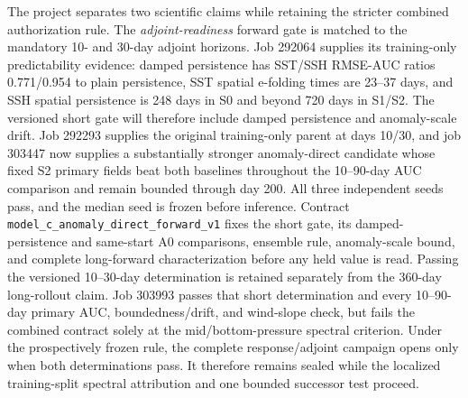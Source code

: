 \documentclass[11pt]{article}
\begin{document}
The project separates two scientific claims while retaining the stricter combined
authorization rule.  The \emph{adjoint-readiness} forward gate is
matched to the mandatory 10- and 30-day adjoint horizons.  Job 292064 supplies its
training-only predictability evidence: damped persistence has SST/SSH RMSE-AUC
ratios 0.771/0.954 to plain persistence, SST spatial e-folding times are
23--37 days, and SSH spatial persistence is 248 days in S0 and beyond 720 days in
S1/S2.  The versioned short gate will therefore include damped persistence and
anomaly-scale drift.  Job 292293 supplies the original training-only parent at days
10/30, and job 303447 now supplies a substantially stronger anomaly-direct candidate
whose fixed S2 primary fields beat both baselines throughout the 10--90-day AUC
comparison and remain bounded through day 200.  All three independent seeds pass,
and the median seed is frozen before inference.  Contract
\texttt{model\_c\_anomaly\_direct\_forward\_v1} fixes the short gate, its
damped-persistence and same-start A0 comparisons, ensemble rule, anomaly-scale bound,
and complete long-forward characterization before any held value is read.  Passing the
versioned 10--30-day determination is retained separately from the 360-day
long-rollout claim.  Job 303993 passes that short determination and every
10--90-day primary AUC, boundedness/drift, and wind-slope check, but fails the
combined contract solely at the mid/bottom-pressure spectral criterion.  Under
the prospectively frozen rule, the complete response/adjoint campaign opens only
when both determinations pass.  It therefore remains sealed while the localized
training-split spectral attribution and one bounded successor test proceed.
\end{document}
